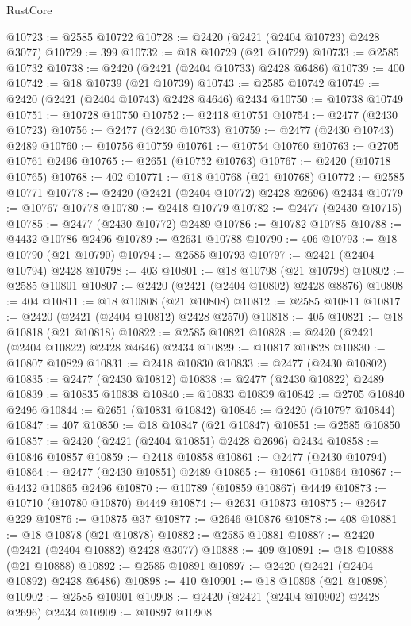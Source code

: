 \begin{lexlean}{RustCore}
\begin{coremodule}
@10723 := @2585 @10722
@10728 := @2420 (@2421 (@2404 @10723) @2428 @3077)
@10729 := 399
@10732 := @18 @10729 (@21 @10729)
@10733 := @2585 @10732
@10738 := @2420 (@2421 (@2404 @10733) @2428 @6486)
@10739 := 400
@10742 := @18 @10739 (@21 @10739)
@10743 := @2585 @10742
@10749 := @2420 (@2421 (@2404 @10743) @2428 @4646) @2434
@10750 := @10738 @10749
@10751 := @10728 @10750
@10752 := @2418 @10751
@10754 := @2477 (@2430 @10723)
@10756 := @2477 (@2430 @10733)
@10759 := @2477 (@2430 @10743) @2489
@10760 := @10756 @10759
@10761 := @10754 @10760
@10763 := @2705 @10761 @2496
@10765 := @2651 (@10752 @10763)
@10767 := @2420 (@10718 @10765)
@10768 := 402
@10771 := @18 @10768 (@21 @10768)
@10772 := @2585 @10771
@10778 := @2420 (@2421 (@2404 @10772) @2428 @2696) @2434
@10779 := @10767 @10778
@10780 := @2418 @10779
@10782 := @2477 (@2430 @10715)
@10785 := @2477 (@2430 @10772) @2489
@10786 := @10782 @10785
@10788 := @4432 @10786 @2496
@10789 := @2631 @10788
@10790 := 406
@10793 := @18 @10790 (@21 @10790)
@10794 := @2585 @10793
@10797 := @2421 (@2404 @10794) @2428
@10798 := 403
@10801 := @18 @10798 (@21 @10798)
@10802 := @2585 @10801
@10807 := @2420 (@2421 (@2404 @10802) @2428 @8876)
@10808 := 404
@10811 := @18 @10808 (@21 @10808)
@10812 := @2585 @10811
@10817 := @2420 (@2421 (@2404 @10812) @2428 @2570)
@10818 := 405
@10821 := @18 @10818 (@21 @10818)
@10822 := @2585 @10821
@10828 := @2420 (@2421 (@2404 @10822) @2428 @4646) @2434
@10829 := @10817 @10828
@10830 := @10807 @10829
@10831 := @2418 @10830
@10833 := @2477 (@2430 @10802)
@10835 := @2477 (@2430 @10812)
@10838 := @2477 (@2430 @10822) @2489
@10839 := @10835 @10838
@10840 := @10833 @10839
@10842 := @2705 @10840 @2496
@10844 := @2651 (@10831 @10842)
@10846 := @2420 (@10797 @10844)
@10847 := 407
@10850 := @18 @10847 (@21 @10847)
@10851 := @2585 @10850
@10857 := @2420 (@2421 (@2404 @10851) @2428 @2696) @2434
@10858 := @10846 @10857
@10859 := @2418 @10858
@10861 := @2477 (@2430 @10794)
@10864 := @2477 (@2430 @10851) @2489
@10865 := @10861 @10864
@10867 := @4432 @10865 @2496
@10870 := @10789 (@10859 @10867) @4449
@10873 := @10710 (@10780 @10870) @4449
@10874 := @2631 @10873
@10875 := @2647 @229
@10876 := @10875 @37
@10877 := @2646 @10876
@10878 := 408
@10881 := @18 @10878 (@21 @10878)
@10882 := @2585 @10881
@10887 := @2420 (@2421 (@2404 @10882) @2428 @3077)
@10888 := 409
@10891 := @18 @10888 (@21 @10888)
@10892 := @2585 @10891
@10897 := @2420 (@2421 (@2404 @10892) @2428 @6486)
@10898 := 410
@10901 := @18 @10898 (@21 @10898)
@10902 := @2585 @10901
@10908 := @2420 (@2421 (@2404 @10902) @2428 @2696) @2434
@10909 := @10897 @10908

\end{coremodule}
\end{lexlean}

